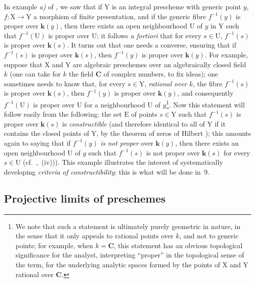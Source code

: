 \begin{env}[8.1.3]
\label{IV.8.1.3}
In example \emph{a)} of , we saw that if $\mathrm{Y}$ is an integral prescheme with generic point $y$, $f:\mathrm{X}\to\mathrm{Y}$ a morphism of finite presentation, and if the generic fibre $f^{-1}(y)$ is proper over $\boldsymbol{k}(y)$, then there exists an open neighbourhood $\mathrm{U}$ of $y$ in $\mathrm{Y}$ such that $f^{-1}(\mathrm{U})$ is proper over $\mathrm{U}$; it follows \emph{a fortiori} that for every $s\in\mathrm{U}$, $f^{-1}(s)$ is proper over $\boldsymbol{k}(s)$.
It turns out that one needs a converse, ensuring that if $f^{-1}(s)$ is proper over $\boldsymbol{k}(s)$, then $f^{-1}(y)$ is proper over $\boldsymbol{k}(y)$.
For example, suppose that $\mathrm{X}$ and $\mathrm{Y}$ are algebraic preschemes over an algebraically closed field $k$ (one can take for $k$ the field $\mathbf{C}$ of complex numbers, to fix ideas); one sometimes needs to know that, for every $s\in\mathrm{Y}$, \emph{rational over $k$}, the fibre $f^{-1}(s)$ is proper over $\boldsymbol{k}(s)$, then $f^{-1}(y)$ is proper over $\boldsymbol{k}(y)$, and consequently $f^{-1}(\mathrm{U})$ is proper over $\mathrm{U}$ for a neighbourhood $\mathrm{U}$ of $y$\footnote{We note that such a statement is ultimately purely geometric in nature, in the sense that it only appeals to rational points over $k$, and not to generic points; for example, when $k=\mathbf{C}$, this statement has an obvious topological significance for the analyst, interpreting ``proper'' in the topological sense of the term, for the underlying analytic spaces formed by the points of $\mathrm{X}$ and $\mathrm{Y}$ rational over $\mathbf{C}$.}.
Now this statement will follow easily from the following: the set $\mathrm{E}$ of points $s\in\mathrm{Y}$ such that $f^{-1}(s)$ is proper over $\boldsymbol{k}(s)$ is \emph{constructible} (and therefore identical to all of $\mathrm{Y}$ if it contains the closed points of $\mathrm{Y}$, by the theorem of zeros of Hilbert ); this amounts again to saying that if $f^{-1}(y)$ \emph{is not proper} over $\boldsymbol{k}(y)$, then there exists an open neighbourhood $\mathrm{U}$ of $y$ such that $f^{-1}(s)$ is not proper over $\boldsymbol{k}(s)$ for every $s\in\mathrm{U}$ (cf.\ ,~(iv))).
This example illustrates the interest of systematically developing \emph{criteria of constructibility}: this is what will be done in \textsection\,9.
\end{env}

\subsection{Projective limits of preschemes}
\label{subsection:IV.8.2}

